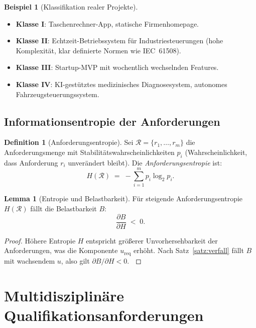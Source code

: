 ﻿\documentclass[a4paper,12pt]{article}
\theoremstyle{definition}
\newtheorem{definition}{Definition}
\newtheorem{beispiel}{Beispiel}
\newtheorem{lemma}{Lemma}
\newenvironment{beweis}{\begin{proof}}{\end{proof}}
\begin{document}
\begin{beispiel}[Klassifikation realer Projekte]
    \begin{itemize}
        \item \textbf{Klasse I}: Taschenrechner-App, statische Firmenhomepage.
        \item \textbf{Klasse II}: Echtzeit-Betriebssystem f\"ur Industriesteuerungen
              (hohe Komplexit\"at, klar definierte Normen wie IEC~61508).
        \item \textbf{Klasse III}: Startup-MVP mit wochentlich wechselnden Features.
        \item \textbf{Klasse IV}: KI-gest\"utztes medizinisches Diagnosesystem,
              autonomes Fahrzeugsteuerungssystem.
    \end{itemize}
\end{beispiel}

\subsection{Informationsentropie der Anforderungen}

\begin{definition}[Anforderungsentropie]
    Sei $\mathcal{R} = \{r_1, \ldots, r_m\}$ die Anforderungsmenge mit
    Stabilit\"atswahrscheinlichkeiten $p_i$ (Wahrscheinlichkeit, dass Anforderung $r_i$
    unver\"andert bleibt). Die \emph{Anforderungsentropie} ist:
    \[
        H(\mathcal{R}) \;=\; -\sum_{i=1}^m p_i \log_2 p_i.
    \]
\end{definition}

\begin{lemma}[Entropie und Belastbarkeit]
    F\"ur steigende Anforderungsentropie $H(\mathcal{R})$ f\"allt die Belastbarkeit $B$:
    \[
        \frac{\partial B}{\partial H} \;<\; 0.
    \]
\end{lemma}

\begin{beweis}
    H\"ohere Entropie $H$ entspricht gr\"o\ss{}erer Unvorhersehbarkeit der Anforderungen,
    was die Komponente $u_{\mathrm{req}}$ erh\"oht. Nach Satz~\ref{satz:verfall} f\"allt
    $B$ mit wachsendem $u$, also gilt $\partial B / \partial H < 0$. $\qedhere$
\end{beweis}

\section{Multidisziplin\"are Qualifikationsanforderungen}
\end{document}
